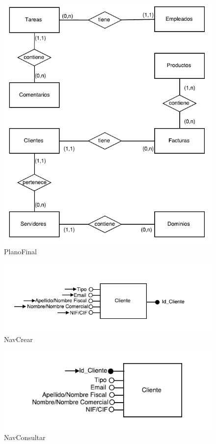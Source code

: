\documentclass[paper=a4, fontsize=11pt, spanish]{scrartcl}
\begin{document}
\begin{figure}
	\includegraphics[width=1.20\textwidth]{PlanoFinal.png}
	\caption{PlanoFinal}
	\label{fig:PlanoFinal}
\end{figure}

\begin{figure}
	\includegraphics[width=1.20\textwidth]{NavCrear.png}
	\caption{NavCrear}
	\label{fig:NavCrear}
\end{figure}

\begin{figure}
	\includegraphics[width=1.20\textwidth]{NavConsultar.png}
	\caption{NavConsultar}
	\label{fig:NavConsultar}
\end{figure}
\end{document}
